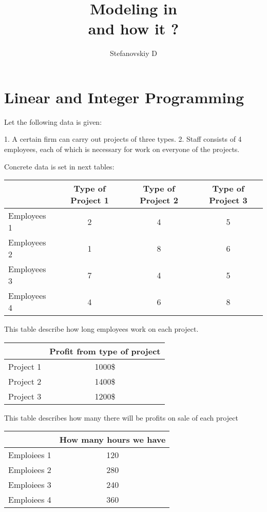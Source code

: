 \documentclass[a4paper,11pt]{scrartcl}
\title{Modeling  in  \R \\ and how it  ?}
\author{ Stefanovskiy D }
\date{}
\begin{document}
\maketitle



\section{Linear and Integer Programming}
\label{sec:lpsolve}
\bigskip
Let the following data is given:

1. A certain firm can carry out projects of three types.
2. Staff consists of 4 employees, each of which is necessary for work on everyone of the projects.

Concrete data is set in  next tables:

\bigskip
\begin{tabular}{|l |c| c| c|}
\hline
& Type of Project 1 &  Type of Project 2 &  Type of Project 3 \\
\hline
Employees 1 &  2 & 4  & 5\\
\hline
Employees 2 & 1 & 8 & 6   \\
\hline
Employees 3 & 7 & 4 & 5  \\
\hline
Employees 4 & 4 & 6 & 8  \\
\hline
\end{tabular}

\bigskip

This table describe how long employees  work on each project.


\bigskip
\begin{tabular}{|l |c| }
\hline
 &  Profit from   type of project  \\
\hline
Project 1 &  1000\$  \\
\hline
Project 2 &  1400\$ \\
\hline
Project 3 &  1200\$  \\
\hline
\end{tabular}

\bigskip

This table describes how many there will be profits on sale of each project 
\bigskip

\begin{tabular}{|l |c| }
\hline
 & How many hours we have  \\
\hline
Emploiees 1 &  120 \\
\hline
Emploiees 2 & 280   \\
\hline
Emploiees 3 & 240  \\
\hline
Emploiees 4 & 360  \\
\hline
\end{tabular}
\end{document}
